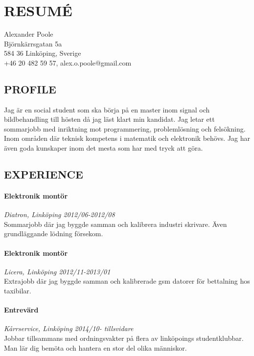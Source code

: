 \documentclass[11pt,fleqn]{article}
\begin{document}
\section*{RESUMÉ}

\raggedleft
Alexander Poole \\
Björnkärrsgatan 5a \\
584 36 Linköping, Sverige \\
+46 20 482 59 57, alex.o.poole@gmail.com \\
\raggedright


\subsection*{PROFILE}
Jag är en social student som ska börja på en master inom signal och bildbehandling till hösten då jag läst klart min kandidat. Jag letar ett sommarjobb med inriktning mot programmering, problemlösning och felsökning. Inom områden där teknisk kompetens i matematik och elektronik behövs. Jag har även goda kunskaper inom det mesta som har med tryck att göra.%

\subsection*{EXPERIENCE}
\paragraph*{Elektronik montör} \textit{Diatron, Linköping 2012/06-2012/08} ~\\
Sommarjobb där jag byggde samman och kalibrera industri skrivare. Även grundläggande lödning försekom.

\paragraph*{Elektronik montör} \textit{Licera, Linköping 2012/11-2013/01} \\
Extrajobb där jag byggde samman och kalibrerade gsm datorer för bettalning hos taxibilar.

\paragraph*{Entrevärd} \textit{Kårrservice, Linköping 2014/10- tillsvidare} \\
Jobbar tillsammans med ordningsvakter på flera av linköpoings studentklubbar. Man lär dig bemöta och hantera en stor del olika människor.
\end{document}
